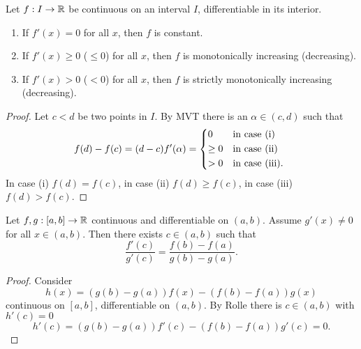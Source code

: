 \begin{theorem}\label{thm:diff_inc_or_dec}
    Let $f : I \to \mathbb{R}$ be continuous on an interval $I$,
    differentiable in its interior.
    \begin{enumerate}[label = (\roman*)]
        \item If $f'(x) = 0$ for all $x$,
        then $f$ is constant.

        \item If $f'(x) \geq 0$
        ($\leq 0$)
        for all $x$,
        then $f$ is monotonically increasing
        (decreasing).

        \item If $f'(x) > 0$
        ($< 0$)
        for all $x$,
        then $f$ is strictly monotonically increasing
        (decreasing).
    \end{enumerate}
\end{theorem}
\begin{proof}
    Let $c < d$ be two points in $I$.
    By MVT there is an $\alpha \in (c, d)$ such that
    \[
    f(d) - f(c) = (d - c)f'(\alpha) = \begin{dcases*}
        0 & in case (i) \\
        \geq 0 & in case (ii) \\
        > 0 & in case (iii).
    \end{dcases*}
    \]
    In case (i) $f(d) = f(c)$,
    in case (ii) $f(d) \geq f(c)$,
    in case (iii) $f(d) > f(c)$.
\end{proof}

\begin{theorem}\label{thm:genmvt}
    Let $f, g : [a, b] \to \mathbb{R}$ continuous and differentiable on $(a, b)$.
    Assume $g'(x) \neq 0$ for all $x \in (a, b)$.
    Then there exists $c \in (a, b)$ such that
    \[
    \frac{f'(c)}{g'(c)} = \frac{f(b) - f(a)}{g(b) - g(a)}.
    \]
\end{theorem}
\begin{proof}
    Consider
    \[
    h(x) = (g(b) - g(a))f(x) - (f(b) - f(a))g(x)
    \]
    continuous on $[a, b]$,
    differentiable on $(a, b)$.
    By Rolle there is $c \in (a, b)$ with $h'(c) = 0$
    \[
    h'(c) = (g(b) - g(a))f'(c) - (f(b) - f(a))g'(c) = 0.
    \]
\end{proof}

